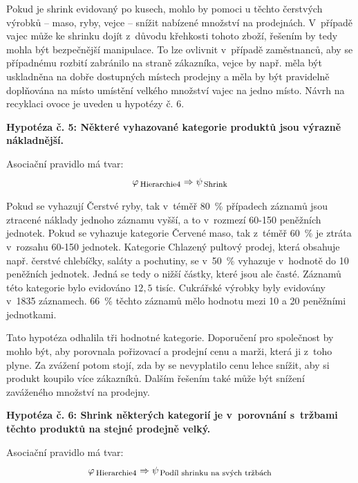 Pokud je shrink evidovaný po kusech, mohlo by pomoci u těchto čerstvých výrobků -- maso, ryby, vejce -- snížit nabízené množství na prodejnách. V~případě vajec může ke shrinku dojít z~důvodu křehkosti tohoto zboží, řešením by tedy mohla být bezpečnější manipulace. To lze ovlivnit v~případě zaměstnanců, aby se případnému rozbití zabránilo na straně zákazníka, vejce by např. měla být uskladněna na dobře dostupných místech prodejny a měla by být pravidelně doplňována na místo umístění velkého množství vajec na jedno místo. Návrh na recyklaci ovoce je uveden u hypotézy č. 6.

\vspace*{1em}

\textbf{Hypotéza č. 5: Některé vyhazované kategorie produktů jsou výrazně nákladnější.}

Asociační pravidlo má tvar:
\begin{equation}
    \varphi_{\mbox{\,\footnotesize Hierarchie4}} \Rightarrow \psi_{\mbox{\,\footnotesize Shrink}}
\end{equation}

Pokud se vyhazují Čerstvé ryby, tak v~téměř 80~\% případech záznamů jsou ztracené náklady jednoho záznamu vyšší, a to v~rozmezí 60-150 peněžních jednotek.
Pokud se vyhazuje kategorie Červené maso, tak z~téměř 60~\% je ztráta v~rozsahu 60-150 jednotek.
Kategorie Chlazený pultový prodej, která obsahuje např. čerstvé chlebíčky, saláty a pochutiny, se v~50~\% vyhazuje v~hodnotě do 10 peněžních jednotek. Jedná se tedy o nižší částky, které jsou ale časté. Záznamů této kategorie bylo evidováno $12{,}5$ tisíc.
Cukrářské výrobky byly evidovány v~1835 záznamech. 66~\% těchto záznamů mělo hodnotu mezi 10 a 20 peněžními jednotkami.

Tato hypotéza odhalila tři hodnotné kategorie. Doporučení pro společnost by mohlo být, aby porovnala pořizovací a prodejní cenu a marži, která ji z~toho plyne. Za zvážení potom stojí, zda by se nevyplatilo cenu lehce snížit, aby si produkt koupilo více zákazníků. Dalším řešením také může být snížení zaváženého množství na prodejny. 

\vspace*{1em}

\textbf{Hypotéza č. 6: Shrink některých kategorií je v~porovnání s~tržbami těchto produktů na stejné prodejně velký.}

Asociační pravidlo má tvar:
\begin{equation}
    \varphi_{\mbox{\,\footnotesize Hierarchie4}} \Rightarrow \psi_{\mbox{\,\footnotesize Podíl shrinku na svých tržbách}}
\end{equation}

